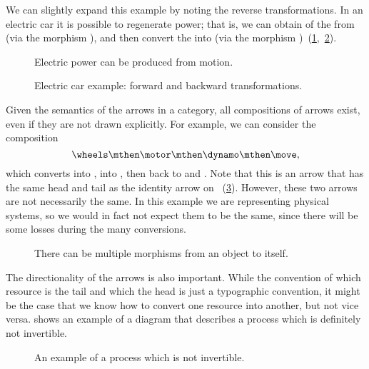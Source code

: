 We can slightly expand this example by noting the reverse transformations.
In an electric car it is possible to regenerate power; that is, we can obtain \rotationalmotion of the \wheels from \translationalmotion (via the morphism \move), and then convert the \rotationalmotion into \electricpower (via the morphism \dynamo)~(\cref{fig:e6},~\cref{fig:e6-together}).

\begin{figure}[h!]
    \centering
    \caption{Electric power can be produced from motion.}
    \label{fig:e6}
\end{figure}

\begin{figure}[h!]
    \centering
    \caption{Electric car example: forward and backward transformations.\label{fig:e6-together}}
\end{figure}

Given the semantics of the arrows in a category, all compositions of arrows exist, even if they are not drawn explicitly.
For example, we can consider the composition
%
\begin{equation}
    \wheels \mthen \motor \mthen \dynamo \mthen \move,
\end{equation}
%
which converts \translationalmotion into \rotationalmotion, into \electricpower, then back to \rotationalmotion and \translationalmotion.
Note that this is an arrow that has the same head and tail as the identity arrow on \translationalmotion~(\cref{fig:e8}).
However, these two arrows are not necessarily the same.
In this example we are representing physical systems, so we would in fact not expect them to be the same, since there will be some losses during the many conversions.

\begin{figure}[h!]
    \centering
    \caption{There can be multiple morphisms from an object to itself.}
    \label{fig:e8}
\end{figure}

The directionality of the arrows is also important.
While the convention of which resource is the tail and which the head is just a typographic convention, it might be the case that we know how to convert one resource into another, but not vice versa.
 shows an example of a diagram that describes a process which is definitely not invertible.

\begin{figure}[h!]
    \centering
    \caption{An example of a process which is not invertible. }
    \label{fig:e10}
\end{figure}


